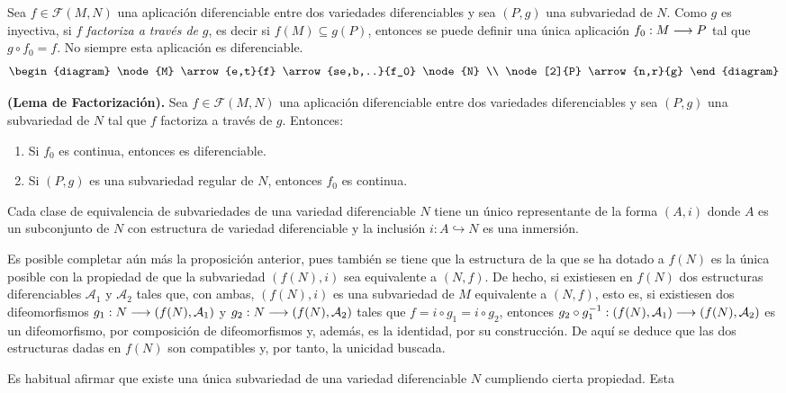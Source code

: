 \documentclass[cursovd_portada.tex]{subfiles}
\begin{document}
Sea $f\in\mathcal{F}(M,N)$ una aplicación diferenciable entre
dos variedades diferenciables y sea $(P,g)$ una subvariedad de
$N$. Como $g$ es inyectiva, si $f$ {\it factoriza a través de}
$g$, es decir si $f(M)\subseteq g(P)$, entonces se puede definir
una única aplicación $f_0:M\longrightarrow P$ tal que $g\circ f_0=f$.
No siempre esta aplicación es diferenciable.
$$\begin{diagram}
\node{M} \arrow{e,t}{f} \arrow{se,b,..}{f_0} \node{N} \\
\node[2]{P} \arrow{n,r}{g}
\end{diagram}$$
\begin{teorema}
{\bf (Lema de Factorización).} Sea $f\in\mathcal{F}(M,N)$ una
aplicación diferenciable entre dos variedades diferenciables y
sea $(P,g)$ una subvariedad de $N$ tal que $f$ factoriza a
través de $g$. Entonces:
\begin{enumerate}
\item Si $f_0$ es continua, entonces es diferenciable. \item Si
$(P,g)$ es una subvariedad regular de $N$, entonces $f_0$ es
continua.
\end{enumerate}
\end{teorema}
\begin{prop}
Cada clase de equivalencia de subvariedades de una variedad
diferenciable $N$ tiene un único representante de la forma
$(A,i)$ donde $A$ es un subconjunto de $N$ con estructura de
variedad diferenciable y la inclusión $i:A\hookrightarrow N$
es una inmersión.
\end{prop}
\hs Es posible completar aún más la proposición
anterior, pues también se tiene que la estructura de la que se
ha dotado a $f(N)$ es la única posible con la propiedad de que
la subvariedad $(f(N),i)$ sea equivalente a $(N,f)$. De hecho, si
existiesen en $f(N)$ dos estructuras diferenciables
$\mathcal{A}_1$ y $\mathcal{A}_2$ tales que, con ambas, $(f(N),i)$
es una subvariedad de $M$ equivalente a $(N,f)$, esto es, si
existiesen dos difeomorfismos $g_1:N\longrightarrow(f(N),\mathcal{A}_1)$ y
$g_2:N\longrightarrow(f(N),\mathcal{A}_2)$ tales que $f=i\circ g_1=i\circ
g_2$, entonces $g_2\circ
g_1^{-1}:(f(N),\mathcal{A}_1)\longrightarrow(f(N),\mathcal{A}_2)$ es un
difeomorfismo, por composición de difeomorfismos y,
además, es la identidad, por su construcción. De aquí
se deduce que las dos estructuras dadas en $f(N)$ son compatibles
y, por tanto, la unicidad buscada.
\par
\hs Es habitual afirmar que existe una única subvariedad de
una variedad diferenciable $N$ cumpliendo cierta propiedad. Esta
\end{document}
